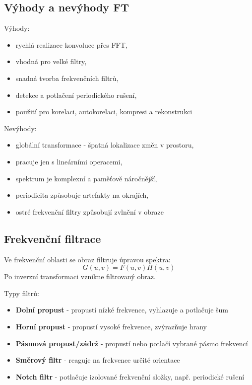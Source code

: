 \subsection*{Výhody a nevýhody FT}
Výhody:
\begin{itemize}
    \item rychlá realizace konvoluce přes FFT,
    \item vhodná pro velké filtry,
    \item snadná tvorba frekvenčních filtrů,
    \item detekce a potlačení periodického rušení,
    \item použití pro korelaci, autokorelaci, kompresi a rekonstrukci
\end{itemize}
Nevýhody:
\begin{itemize}
    \item globální transformace - špatná lokalizace změn v prostoru,
    \item pracuje jen s lineárními operacemi,
    \item spektrum je komplexní a paměťově náročnější,
    \item periodicita způsobuje artefakty na okrajích,
    \item ostré frekvenční filtry způsobují zvlnění v obraze
\end{itemize}

\subsection*{Frekvenční filtrace}
Ve frekvenční oblasti se obraz filtruje úpravou spektra:
\begin{equation}
    G(u,v)=F(u,v)H(u,v)
\end{equation}
Po inverzní transformaci vznikne filtrovaný obraz.

Typy filtrů:
\begin{itemize}
    \item \textbf{Dolní propust} - propustí nízké frekvence, vyhlazuje a potlačuje šum
    \item \textbf{Horní propust} - propustí vysoké frekvence, zvýrazňuje hrany
    \item \textbf{Pásmová propust/zádrž} - propustí nebo potlačí vybrané pásmo frekvencí
    \item \textbf{Směrový filtr} - reaguje na frekvence určité orientace
    \item \textbf{Notch filtr} - potlačuje izolované frekvenční složky, např. periodické rušení
\end{itemize}

